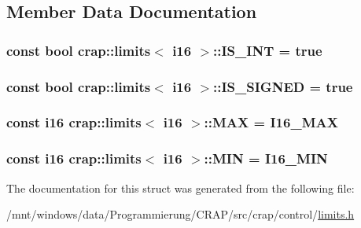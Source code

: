 \subsection{Member Data Documentation}
\hypertarget{structcrap_1_1limits_3_01i16_01_4_a9d0b16f84b3813fe161bcd5c4758750d}{
\subsubsection[{I\-S\-\_\-\-I\-N\-T}]{\setlength{\rightskip}{0pt plus 5cm}const bool {\bf crap\-::limits}$<$ {\bf i16} $>$\-::I\-S\-\_\-\-I\-N\-T = true\hspace{0.3cm}{\ttfamily [static]}}}\label{structcrap_1_1limits_3_01i16_01_4_a9d0b16f84b3813fe161bcd5c4758750d}
\hypertarget{structcrap_1_1limits_3_01i16_01_4_acaf692f3f9189b8439fda32001539b55}{
\subsubsection[{I\-S\-\_\-\-S\-I\-G\-N\-E\-D}]{\setlength{\rightskip}{0pt plus 5cm}const bool {\bf crap\-::limits}$<$ {\bf i16} $>$\-::I\-S\-\_\-\-S\-I\-G\-N\-E\-D = true\hspace{0.3cm}{\ttfamily [static]}}}\label{structcrap_1_1limits_3_01i16_01_4_acaf692f3f9189b8439fda32001539b55}
\hypertarget{structcrap_1_1limits_3_01i16_01_4_a13ea6e73f00832ef4ee180905c515a50}{
\subsubsection[{M\-A\-X}]{\setlength{\rightskip}{0pt plus 5cm}const {\bf i16} {\bf crap\-::limits}$<$ {\bf i16} $>$\-::M\-A\-X = {\bf I16\-\_\-\-M\-A\-X}\hspace{0.3cm}{\ttfamily [static]}}}\label{structcrap_1_1limits_3_01i16_01_4_a13ea6e73f00832ef4ee180905c515a50}
\hypertarget{structcrap_1_1limits_3_01i16_01_4_aa889fd67d3f189c3088083ee7fcc864d}{
\subsubsection[{M\-I\-N}]{\setlength{\rightskip}{0pt plus 5cm}const {\bf i16} {\bf crap\-::limits}$<$ {\bf i16} $>$\-::M\-I\-N = {\bf I16\-\_\-\-M\-I\-N}\hspace{0.3cm}{\ttfamily [static]}}}\label{structcrap_1_1limits_3_01i16_01_4_aa889fd67d3f189c3088083ee7fcc864d}


The documentation for this struct was generated from the following file\-:\begin{DoxyCompactItemize}
\item 
/mnt/windows/data/\-Programmierung/\-C\-R\-A\-P/src/crap/control/\hyperlink{limits_8h}{limits.\-h}\end{DoxyCompactItemize}
